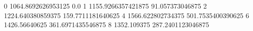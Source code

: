 0 1064.8692626953125 0.0
1 1155.9266357421875 91.057373046875
2 1224.640380859375 159.7711181640625
4 1566.622802734375 501.7535400390625
6 1426.56640625 361.6971435546875
8 1352.109375 287.2401123046875
